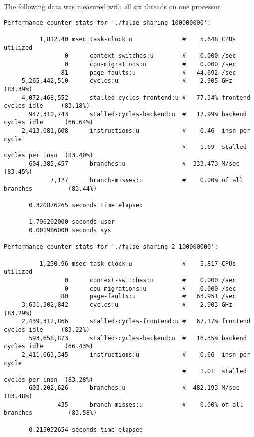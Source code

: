 \documentclass[parskip]{scrartcl}
\begin{document}
	The following data was measured with all six threads on one processor.
	{\footnotesize
	\begin{verbatim}
Performance counter stats for './false_sharing 100000000':

          1,812.40 msec task-clock:u              #    5.648 CPUs utilized          
                 0      context-switches:u        #    0.000 /sec                   
                 0      cpu-migrations:u          #    0.000 /sec                   
                81      page-faults:u             #   44.692 /sec                   
     5,265,442,510      cycles:u                  #    2.905 GHz                      (83.39%)
     4,072,468,552      stalled-cycles-frontend:u #   77.34% frontend cycles idle     (83.18%)
       947,310,743      stalled-cycles-backend:u  #   17.99% backend cycles idle      (66.64%)
     2,413,081,608      instructions:u            #    0.46  insn per cycle         
                                                  #    1.69  stalled cycles per insn  (83.40%)
       604,385,457      branches:u                #  333.473 M/sec                    (83.45%)
             7,127      branch-misses:u           #    0.00% of all branches          (83.44%)

       0.320876265 seconds time elapsed

       1.796202000 seconds user
       0.001986000 seconds sys

Performance counter stats for './false_sharing_2 100000000':

          1,250.96 msec task-clock:u              #    5.817 CPUs utilized          
                 0      context-switches:u        #    0.000 /sec                   
                 0      cpu-migrations:u          #    0.000 /sec                   
                80      page-faults:u             #   63.951 /sec                   
     3,631,302,842      cycles:u                  #    2.903 GHz                      (83.29%)
     2,439,312,866      stalled-cycles-frontend:u #   67.17% frontend cycles idle     (83.22%)
       593,658,873      stalled-cycles-backend:u  #   16.35% backend cycles idle      (66.43%)
     2,411,063,345      instructions:u            #    0.66  insn per cycle         
                                                  #    1.01  stalled cycles per insn  (83.28%)
       603,202,626      branches:u                #  482.193 M/sec                    (83.48%)
               435      branch-misses:u           #    0.00% of all branches          (83.58%)

       0.215052654 seconds time elapsed
	\end{verbatim}
 	}
\end{document}

